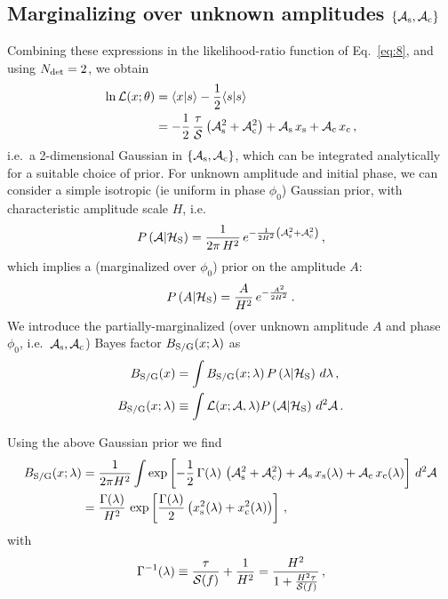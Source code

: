 \documentclass[aps,prd,onecolumn,nofootinbib,superscriptaddress,altaffilletter,floatfix]{revtex4-1}
\begin{document}
\subsection{Marginalizing over unknown amplitudes $\{\mathcal{A}_{\mathrm{s}},\mathcal{A}_{\mathrm{c}}\}$}
\label{sec:marg-over-unkn}

Combining these expressions in the likelihood-ratio function of Eq.~\eqref{eq:8}, and using $N_{\mathrm{det}}=2$, we obtain
\begin{align}
  \label{eq:21}
  \ln \mathcal{L}(x;\theta) &= \langle x|s\rangle - \frac{1}{2}\langle s|s\rangle\\
  &= -\frac{1}{2}\,\frac{\tau}{\mathcal{S}}\left(\mathcal{A}_{\mathrm{s}}^2+\mathcal{A}_{\mathrm{c}}^2\right) + \mathcal{A}_{\mathrm{s}}\,x_{\mathrm{s}} + \mathcal{A}_{\mathrm{c}}\,x_{\mathrm{c}}\,,
\end{align}
i.e.\ a 2-dimensional Gaussian in $\{\mathcal{A}_{\mathrm{s}},\mathcal{A}_{\mathrm{c}}\}$, which can be integrated analytically for a suitable choice of prior.
For unknown amplitude and initial phase, we can consider a simple isotropic (ie uniform in phase $\phi_0$) Gaussian prior, with
characteristic amplitude scale $H$, i.e.\
\begin{equation}
  \label{eq:22}
  P\left(\mathcal{A}|\mathcal{H}_{\mathrm{S}}\right) = \frac{1}{2\pi\,H^2}\,e^{-\frac{1}{2H^2}\left(\mathcal{A}_{\mathrm{s}}^2 + \mathcal{A}_{\mathrm{c}}^2\right)}\,,
\end{equation}
which implies a (marginalized over $\phi_0$) prior on the amplitude $A$:
\begin{equation}
  \label{eq:28}
  P\left(A|\mathcal{H}_{\mathrm{S}}\right) = \frac{A}{H^2}\,e^{-\frac{A^2}{2H^2}}\,.
\end{equation}
We introduce the partially-marginalized (over unknown amplitude $A$ and phase $\phi_0$, i.e.\ $\mathcal{A}_{\mathrm{s}},\mathcal{A}_{\mathrm{c}}$) Bayes factor $B_{\mathrm{S/G}}(x;\lambda)$ as
\begin{align}
  \label{eq:23}
  B_{\mathrm{S/G}}(x) &= \int B_{\mathrm{S/G}}(x;\lambda) \,P\left(\lambda|\mathcal{H}_{\mathrm{S}}\right)\,d\lambda\,,\\
  B_{\mathrm{S/G}}(x;\lambda) &\equiv \int \mathcal{L}(x;\mathcal{A},\lambda)P\left(\mathcal{A}|\mathcal{H}_{\mathrm{S}}\right)\,d^2\mathcal{A}\,.
\end{align}

Using the above Gaussian prior we find
\begin{align}
  \label{eq:29}
  B_{\mathrm{S/G}}(x;\lambda) &= \frac{1}{2\pi H^2}\int \exp\left[-\frac{1}{2}\,\Gamma(\lambda)\,\left(\mathcal{A}_{\mathrm{s}}^2+\mathcal{A}_{\mathrm{c}}^2\right) + \mathcal{A}_{\mathrm{s}}\,x_{\mathrm{s}}(\lambda) + \mathcal{A}_{\mathrm{c}}\,x_{\mathrm{c}}(\lambda)\right]\,d^2\mathcal{A}\\
  &=\frac{\Gamma(\lambda)}{H^2} \, \exp\left[\frac{\Gamma(\lambda)}{2}\left(x_{\mathrm{s}}^2(\lambda) + x_{\mathrm{c}}^2(\lambda)\right)\right]\,,
\end{align}
with
\begin{equation}
  \label{eq:25}
  \Gamma^{-1}(\lambda) \equiv \frac{\tau}{\mathcal{S}(f)} + \frac{1}{H^2} = \frac{H^2}{1 + \frac{H^2\tau}{\mathcal{S}(f)}}\,,
\end{equation}
\end{document}
